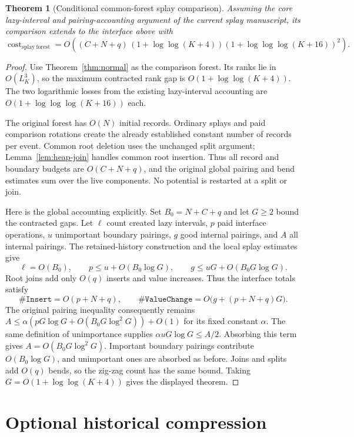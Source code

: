 \documentclass[11pt]{article}
\newtheorem{theorem}{Theorem}
\newcommand{\cost}{\operatorname{cost}}
\begin{document}
\begin{theorem}[Conditional common-forest splay comparison]
Assuming the core lazy-interval and pairing-accounting argument of the
current splay manuscript, its comparison extends to the interface above
with
\[
 \cost_{\mathrm{splay\ forest}}
 =O\!\left((C+N+q)\,
   (1+\log\log(K+4))
   (1+\log\log\log(K+16))^2\right).
\]
\end{theorem}

\begin{proof}
Use Theorem~\ref{thm:normal} as the comparison forest. Its ranks lie in
$O(L_K^3)$, so the maximum contracted rank gap is $O(1+\log\log(K+4))$.
The two logarithmic losses from the existing lazy-interval accounting
are $O(1+\log\log\log(K+16))$ each.

The original forest has $O(N)$ initial records. Ordinary splays and
paid comparison rotations create the already established constant
number of records per event. Common root deletion uses the unchanged
split argument; Lemma~\ref{lem:heap-join} handles common root insertion.
Thus all record and boundary budgets are $O(C+N+q)$, and the original
global pairing and bend estimates sum over the live components.
No potential is restarted at a split or join.

Here is the global accounting explicitly. Set $B_0=N+C+q$ and let
$G\ge2$ bound the contracted gaps. Let $\ell$ count created lazy
intervals, $p$ paid interface operations, $u$ unimportant boundary
pairings, $g$ good internal pairings, and $A$ all internal pairings.
The retained-history construction and the local splay estimates give
\[
 \ell=O(B_0),\qquad
 p\le u+O(B_0\log G),\qquad
 g\le uG+O(B_0G\log G).
\]
Root joins add only $O(q)$ inserts and value increases. Thus the
interface totals satisfy
\[
 \#\texttt{Insert}=O(p+N+q),\qquad
 \#\texttt{ValueChange}=O\bigl(g+(p+N+q)G\bigr).
\]
The original pairing inequality consequently remains
$A\le\alpha(pG\log G+O(B_0G\log^2G))+O(1)$ for its fixed constant
$\alpha$. The same definition of unimportance supplies
$\alpha uG\log G\le A/2$. Absorbing this term gives
$A=O(B_0G\log^2G)$. Important boundary pairings contribute
$O(B_0\log G)$, and unimportant ones are absorbed as before. Joins
and splits add $O(q)$ bends, so the zig-zag count has the same bound.
Taking $G=O(1+\log\log(K+4))$ gives the displayed theorem.
\end{proof}

\section{Optional historical compression}
\end{document}
